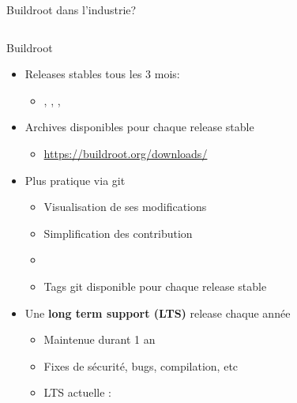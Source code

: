 \begin{frame}{Buildroot dans l'industrie?}
\begin{columns}
  \end{columns}
\end{frame}

\begin{frame}{Buildroot}
  \begin{itemize}
  \item Releases stables tous les 3 mois:
    \begin{itemize}
    \item {}, , ,
    \end{itemize}
  \item Archives disponibles pour chaque release stable
    \begin{itemize}
    \item \url{https://buildroot.org/downloads/}
    \end{itemize}
  \item Plus pratique via git
    \begin{itemize}
    \item Visualisation de ses modifications
    \item Simplification des contribution
    \item {}
    \item Tags git disponible pour chaque release stable
    \end{itemize}
  \item Une {\bf long term support (LTS)} release chaque année
    \begin{itemize}
    \item Maintenue durant 1 an
    \item Fixes de sécurité, bugs, compilation, etc
    \item LTS actuelle : 
    \end{itemize}
  \end{itemize}
\end{frame}

